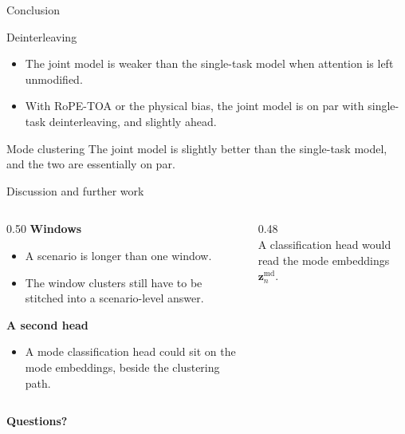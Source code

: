 \documentclass[aspectratio=169,10pt]{beamer}
\newcommand{\vect}[1]{\bm{#1}}
\newcommand{\thesisfig}[3]{%
  \resizebox{#1}{#2}{}%
}
\begin{document}
\begin{frame}{Conclusion}
  \begin{block}{Deinterleaving}
    \begin{itemize}
      \item The joint model is weaker than the single-task model when attention is left unmodified.
      \item With RoPE-TOA or the physical bias, the joint model is on par with single-task deinterleaving, and slightly ahead.
    \end{itemize}
  \end{block}
  \vspace{0.6em}
  \begin{block}{Mode clustering}
    The joint model is slightly better than the single-task model, and the two are essentially on par.
  \end{block}
\end{frame}

\begin{frame}{Discussion and further work}
  \begin{columns}[T,onlytextwidth]
    \begin{column}{0.50\textwidth}
      \textbf{Windows}
      \begin{itemize}
        \item A scenario is longer than one window.
        \item The window clusters still have to be stitched into a scenario-level answer.
      \end{itemize}
      \vspace{0.8em}
      \textbf{A second head}
      \begin{itemize}
        \item A mode classification head could sit on the mode embeddings, beside the clustering path.
      \end{itemize}
    \end{column}
    \begin{column}{0.48\textwidth}
      \centering
      \thesisfig{!}{0.70\textheight}{../figures/method/architecture.tex}\\[0.2em]
      {\footnotesize A classification head would read the mode embeddings \(\vect{z}^{\mathrm{md}}_n\).}
    \end{column}
  \end{columns}
\end{frame}

\begin{frame}
  \vfill
  \centering
  {\Huge\bfseries Questions?\par}
  \vfill
\end{frame}
\end{document}
